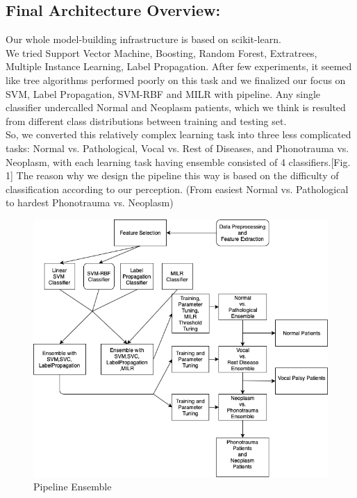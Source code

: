 \subsection{Final Architecture Overview:}
	Our whole model-building infrastructure is based on scikit-learn\cite{b7}\cite{b8}. \\
	\indent We tried Support Vector Machine, Boosting, Random Forest, Extratrees, Multiple Instance Learning, Label Propagation. After few experiments, it seemed like tree algorithms performed poorly on this task and we finalized our focus on SVM, Label Propagation, SVM-RBF and MILR with pipeline. Any single classifier undercalled Normal and Neoplasm patients, which we think is resulted from different class distributions between training and testing set. \\
\indent So, we converted this relatively complex learning task into three less complicated tasks: Normal vs. Pathological, Vocal vs. Rest of Diseases, and Phonotrauma vs. Neoplasm, with each learning task having ensemble consisted of 4 classifiers.[Fig. 1] The reason why we design the pipeline this way is based on the difficulty of classification according to our perception. (From easiest Normal vs. Pathological to hardest Phonotrauma vs. Neoplasm)\\
	\begin{figure}[!htbp]
		\begin{center}
			\includegraphics[scale=0.35]{Diagram_3.png}
		\end{center}
		\caption{Pipeline Ensemble}
	\end{figure}

